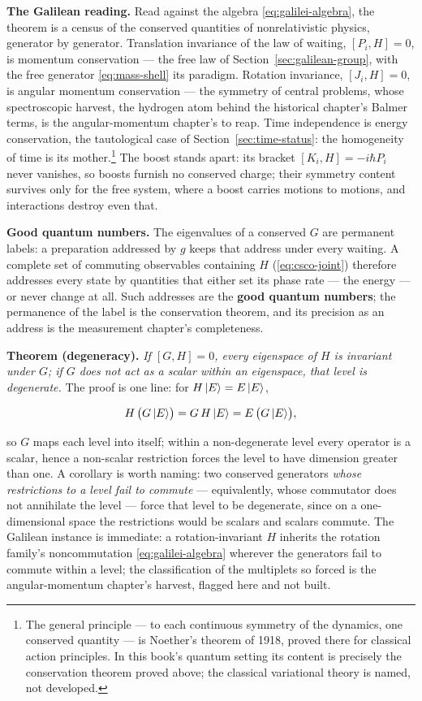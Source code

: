 \textbf{The Galilean reading.} Read against the algebra \eqref{eq:galilei-algebra}, the theorem is a census of the conserved quantities of nonrelativistic physics, generator by generator. Translation invariance of the law of waiting, $[P_i,H] = 0$, is momentum conservation --- the free law of Section~\ref{sec:galilean-group}, with the free generator \eqref{eq:mass-shell} its paradigm. Rotation invariance, $[J_i,H] = 0$, is angular momentum conservation --- the symmetry of central problems, whose spectroscopic harvest, the hydrogen atom behind the historical chapter's Balmer terms, is the angular-momentum chapter's to reap. Time independence is energy conservation, the tautological case of Section~\ref{sec:time-status}: the homogeneity of time is its mother.\footnote{The general principle --- to each continuous symmetry of the dynamics, one conserved quantity --- is Noether's theorem of 1918, proved there for classical action principles. In this book's quantum setting its content is precisely the conservation theorem proved above; the classical variational theory is named, not developed.} The boost stands apart: its bracket $[K_i,H] = -i\hbar P_i$ never vanishes, so boosts furnish no conserved charge; their symmetry content survives only for the free system, where a boost carries motions to motions, and interactions destroy even that.

\textbf{Good quantum numbers.} The eigenvalues of a conserved $G$ are permanent labels: a preparation addressed by $g$ keeps that address under every waiting. A complete set of commuting observables containing $H$ (\eqref{eq:csco-joint}) therefore addresses every state by quantities that either set its phase rate --- the energy --- or never change at all. Such addresses are the \textbf{good quantum numbers}; the permanence of the label is the conservation theorem, and its precision as an address is the measurement chapter's completeness.

\textbf{Theorem (degeneracy).} \emph{If $[G,H] = 0$, every eigenspace of $H$ is invariant under $G$; if $G$ does not act as a scalar within an eigenspace, that level is degenerate.} The proof is one line: for $H\ket{E} = E\ket{E}$,
\begin{linenomath}
    \begin{equation}
        H\,\bigl(G\ket{E}\bigr) = G\,H\ket{E} = E\,\bigl(G\ket{E}\bigr) ,
        \label{eq:degeneracy-invariance}
    \end{equation}
\end{linenomath}
so $G$ maps each level into itself; within a non-degenerate level every operator is a scalar, hence a non-scalar restriction forces the level to have dimension greater than one. A corollary is worth naming: two conserved generators \emph{whose restrictions to a level fail to commute} --- equivalently, whose commutator does not annihilate the level --- force that level to be degenerate, since on a one-dimensional space the restrictions would be scalars and scalars commute. The Galilean instance is immediate: a rotation-invariant $H$ inherits the rotation family's noncommutation \eqref{eq:galilei-algebra} wherever the generators fail to commute within a level; the classification of the multiplets so forced is the angular-momentum chapter's harvest, flagged here and not built.

